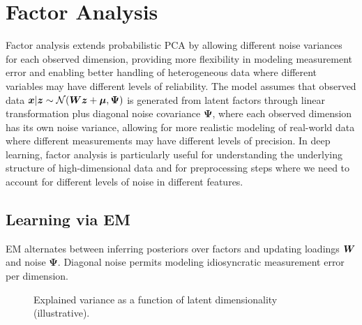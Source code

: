 
\section{Factor Analysis }
\label{sec:factor-analysis}

Factor analysis extends probabilistic PCA by allowing different noise variances for each observed dimension, providing more flexibility in modeling measurement error and enabling better handling of heterogeneous data where different variables may have different levels of reliability. The model assumes that observed data $\boldsymbol{x} | \boldsymbol{z} \sim \mathcal{N}(\boldsymbol{W}\boldsymbol{z} + \boldsymbol{\mu}, \boldsymbol{\Psi})$ is generated from latent factors through linear transformation plus diagonal noise covariance $\boldsymbol{\Psi}$, where each observed dimension has its own noise variance, allowing for more realistic modeling of real-world data where different measurements may have different levels of precision. In deep learning, factor analysis is particularly useful for understanding the underlying structure of high-dimensional data and for preprocessing steps where we need to account for different levels of noise in different features.


\subsection{Learning via EM}

EM alternates between inferring posteriors over factors and updating loadings $\boldsymbol{W}$ and noise $\boldsymbol{\Psi}$. Diagonal noise permits modeling idiosyncratic measurement error per dimension.

\begin{figure}[h]
  \centering
  \caption{Explained variance as a function of latent dimensionality (illustrative).}
  \label{fig:fa-variance}
\end{figure}

